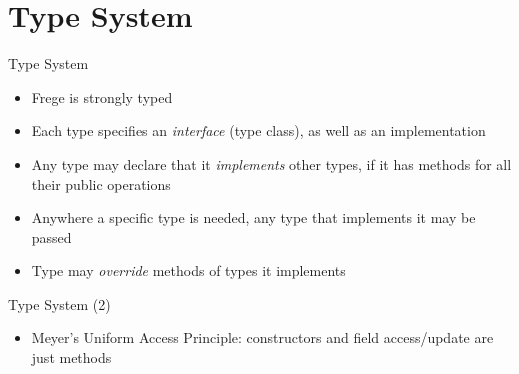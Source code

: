 \documentclass[12pt]{beamer}
\newcommand{\frege}{\textsf{Frege}\xspace}
\begin{document}
\section{Type System}
\begin{frame}{\LARGE Type System}
  \begin{itemize}
  \item \frege is strongly typed
  \item Each type specifies an \emph{interface} (type class), as well as an
    implementation
  \item Any type may declare that it \emph{implements} other types, if it has
    methods for all their public operations
  \item Anywhere a specific type is needed, any type that implements it may
    be passed
  \item Type may \emph{override} methods of types it implements
  \end{itemize}
\end{frame}


\begin{frame}{\LARGE Type System (2)}
  \begin{itemize}
  \item Meyer's Uniform Access Principle: constructors and field
    access/update are just methods
  \end{itemize}
\end{frame}


\end{document}
